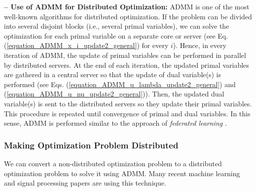 \documentclass[lang=cn,10pt]{gorgeousnbook}
\numberwithin{equation}{section}%
\numberwithin{figure}{section}%
\begin{document}
\hfill\break
\textbf{-- Use of ADMM for Distributed Optimization:}
ADMM is one of the most well-known algorithms for distributed optimization. If the problem can be divided into several disjoint blocks (i.e., several primal variables), we can solve the optimization for each primal variable on a separate core or server (see Eq. (\ref{equation_ADMM_x_i_update2_general}) for every $i$). Hence, in every iteration of ADMM, the update of primal variables can be performed in parallel by distributed servers. At the end of each iteration, the updated primal variables are gathered in a central server so that the update of dual variable(s) is performed (see Eqs. (\ref{equation_ADMM_u_lambda_update2_general}) and (\ref{equation_ADMM_u_nu_update2_general})). Then, the updated dual variable(s) is sent to the distributed servers so they update their primal variables. This procedure is repeated until convergence of primal and dual variables. 
In this sense, ADMM is performed similar to the approach of \textit{federated learning} \cite{konevcny2015federated,li2020federated}. 

\subsubsection{Making Optimization Problem Distributed}

We can convert a non-distributed optimization problem to a distributed optimization problem to solve it using ADMM. 
Many recent machine learning and signal processing papers are using this technique. 
\end{document}

